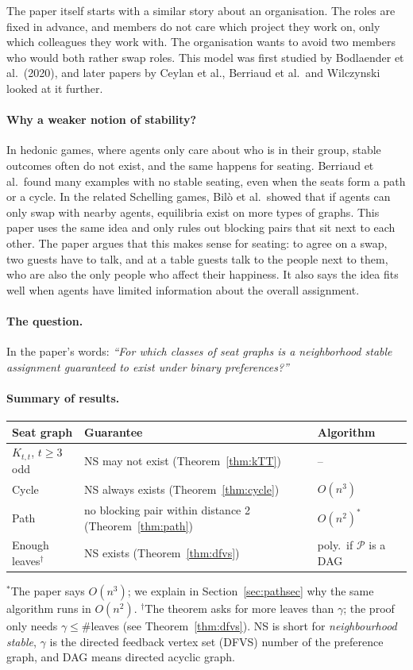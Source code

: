 \documentclass[11pt,a4paper]{article}
\theoremstyle{definition}
\theoremstyle{remark}
\theoremstyle{plain}
\newcommand{\cP}{\mathcal{P}}
\begin{document}
The paper itself starts with a similar story about an organisation. The roles are fixed in advance, and members do not care which project they work on, only which colleagues they work with. The organisation wants to avoid two members who would both rather swap roles. This model was first studied by Bodlaender et al.\ (2020), and later papers by Ceylan et al., Berriaud et al.\ and Wilczynski looked at it further.

\paragraph{Why a weaker notion of stability?} In hedonic games, where agents only care about who is in their group, stable outcomes often do not exist, and the same happens for seating. Berriaud et al.\ found many examples with no stable seating, even when the seats form a path or a cycle. In the related Schelling games, Bil\`o et al.\ showed that if agents can only swap with nearby agents, equilibria exist on more types of graphs. This paper uses the same idea and only rules out blocking pairs that sit next to each other. The paper argues that this makes sense for seating: to agree on a swap, two guests have to talk, and at a table guests talk to the people next to them, who are also the only people who affect their happiness. It also says the idea fits well when agents have limited information about the overall assignment.

\paragraph{The question.} In the paper's words: \emph{``For which classes of seat graphs is a neighborhood stable assignment guaranteed to exist under binary preferences?''}

\paragraph{Summary of results.}
\begin{center}\small
\renewcommand{\arraystretch}{1.25}
\begin{tabular}{@{}lll@{}}
\toprule
\textbf{Seat graph} & \textbf{Guarantee} & \textbf{Algorithm} \\
\midrule
$K_{t,t}$, $t\ge3$ odd & NS may not exist (Theorem~\ref{thm:kTT}) & -- \\
Cycle & NS always exists (Theorem~\ref{thm:cycle}) & $O(n^3)$ \\
Path & no blocking pair within distance 2 (Theorem~\ref{thm:path}) & $O(n^2)^{*}$ \\
Enough leaves$^{\dagger}$ & NS exists (Theorem~\ref{thm:dfvs}) & poly.\ if $\cP$ is a DAG \\
\bottomrule
\end{tabular}
\end{center}
$^{*}$The paper says $O(n^3)$; we explain in Section~\ref{sec:pathsec} why the same algorithm runs in $O(n^2)$. $^{\dagger}$The theorem asks for more leaves than $\gamma$; the proof only needs $\gamma\le\#$leaves (see Theorem~\ref{thm:dfvs}). NS is short for \emph{neighbourhood stable}, $\gamma$ is the directed feedback vertex set (DFVS) number of the preference graph, and DAG means directed acyclic graph.
\end{document}
